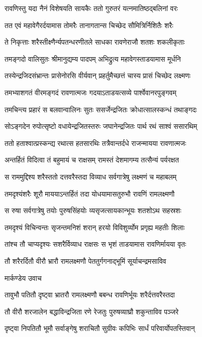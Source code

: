 \twolineshloka
{रावणिस्तु यदा नैनं विशेषयति सायकैः}
{ततो गुरुतरं यत्नमातिष्ठद्बलिनां वरः}


\twolineshloka
{तत एवं महावेगैरर्दयामास तोमरैः}
{तानागतान्स चिच्छेद सौमित्रिर्निशितैः शरैः}


\twolineshloka
{ते निकृत्ताः शरैस्तीक्ष्णैर्न्यपतन्धरणीतले}
{साधका रावणेराजौ शतशः शकलीकृताः}


\twolineshloka
{तमङ्गदो वालिसुतः श्रीमानुद्यम्य पादपम्}
{अभिद्रुत्य महावेगस्ताडयामास मूर्धनि}


\twolineshloka
{तस्येन्द्रजिदसंभ्रान्तः प्रासेनोरसि वीर्यवान्}
{प्रहर्तुमैच्छत्तं चास्य प्रासं चिच्छेद लक्ष्मणः}


\twolineshloka
{तमभ्याशगतं वीरमङ्गदं रावणात्मजः}
{गदयाऽताडयत्सव्ये पार्श्वेवानरपुङ्गवम्}


\twolineshloka
{तमचिन्त्य प्रहारं स बलवान्वालिनः सुतः}
{ससर्जेन्द्रजितः क्रोधात्सालस्कन्धं तथाङ्गदः}


\twolineshloka
{सोऽङ्गदेन रुपोत्सृष्टो वधायेन्द्रजितस्तरुः}
{जघानेन्द्रजितः पार्थ रथं साश्वं ससारथिम्}


\twolineshloka
{ततो हताश्वात्प्रस्कन्द्य रथात्स हतसारथिः}
{तत्रैवान्तर्दधे राजन्मायया रावणात्मजः}


\twolineshloka
{अन्तर्हितं विदित्वा तं बहुमायं च राक्षसम्}
{रामस्तं देशमागम्य तत्सैन्यं पर्यरक्षत}


\twolineshloka
{स राममुद्दिश्य शरैस्ततो दत्तवरैस्तदा}
{विव्याध सर्वगात्रेषु लक्ष्मणं च महाबलम्}


\twolineshloka
{तमदृश्यंशरैः शूरौ माययाऽन्तर्हितं तदा}
{योधयामासतुरुभौ रावणिं रामलक्ष्मणौ}


\twolineshloka
{स रुषा सर्वगात्रेषु तयोः पुरुषसिंहयोः}
{व्यसृजत्सायकान्भूयः शतशोऽथ सहस्रशः}


\twolineshloka
{तमदृश्यं विचिन्वन्तः सृजन्तमनिशं शरान्}
{हरयो विविशुर्व्योम प्रगृह्य महतीः शिलाः}


\twolineshloka
{तांश्च तौ चाप्यदृश्यः सशरैर्विव्याध राक्षसः}
{स भृशं ताडयामास रावणिर्मायया वृतः}


\twolineshloka
{तौ शरैरर्दितौ वीरौ भ्रारौ रामलक्ष्मणौ}
{पेततुर्गगनाद्भूमिं सूर्याचन्द्रमसाविव}


\twolineshloka
{मार्कण्डेय उवाच}
{}


\twolineshloka
{तावुभौ पतितौ दृष्ट्वा भ्रातरौ रामलक्ष्मणौ}
{बबन्ध रावणिर्भूयः शरैर्दत्तवरैस्तदा}


\twolineshloka
{तौ वीरौ शरजालेन बद्धाविन्द्रजिता रणे}
{रेजतुः पुरुषव्याघ्रौ शकुन्ताविव पञ्जरे}


\twolineshloka
{दृष्ट्वा निपतितौ भूमौ सर्वाङ्गेषु शराचितौ}
{सुग्रीवः कपिभिः सार्धं परिवार्योपतस्तिवान्}


